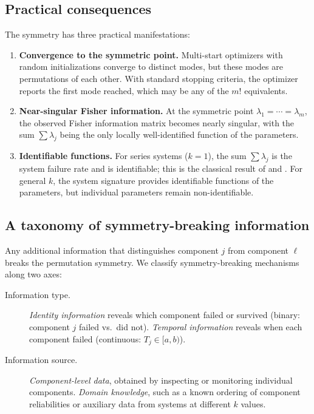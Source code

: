 \documentclass[12pt]{article}
\begin{document}
\subsection{Practical consequences}\label{sec:consequences}

The symmetry has three practical manifestations:
\begin{enumerate}
  \item \textbf{Convergence to the symmetric point.}  Multi-start
    optimizers with random initializations converge to distinct modes, but
    these modes are permutations of each other.  With standard stopping
    criteria, the optimizer reports the first mode reached, which may be any
    of the $m!$ equivalents.

  \item \textbf{Near-singular Fisher information.}  At the symmetric point
    $\lambda_1 = \cdots = \lambda_m$, the observed Fisher information matrix
    becomes nearly singular, with the sum $\sum \lambda_j$ being the only
    locally well-identified function of the parameters.

  \item \textbf{Identifiable functions.}  For series systems ($k = 1$),
    the sum $\sum \lambda_j$ is the system failure rate and is identifiable;
    this is the classical result of \citet{Cox1959} and \citet{Tsiatis1975}.
    For general $k$, the system signature provides identifiable functions
    of the parameters, but individual parameters remain non-identifiable.
\end{enumerate}

\subsection{A taxonomy of symmetry-breaking information}
\label{sec:taxonomy}

Any additional information that distinguishes component $j$ from component
$\ell$ breaks the permutation symmetry.  We classify symmetry-breaking
mechanisms along two axes:
\begin{description}
  \item[Information type.]
    \emph{Identity information} reveals which component failed or survived
    (binary: component $j$ failed vs.\ did not).
    \emph{Temporal information} reveals when each component failed (continuous:
    $T_j \in [a, b)$).

  \item[Information source.]
    \emph{Component-level data}, obtained by inspecting or monitoring
    individual components.
    \emph{Domain knowledge}, such as a known ordering of component
    reliabilities or auxiliary data from systems at different $k$ values.
\end{description}
\end{document}
